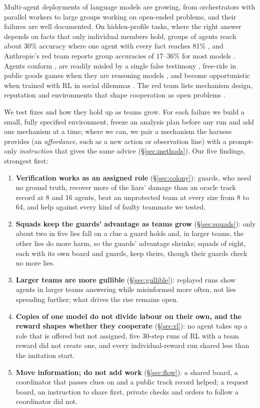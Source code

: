 \documentclass{article}
\begin{document}
Multi-agent deployments of language models are growing, from orchestrators with parallel workers \citep{anthropic2025research} to large groups working on open-ended problems, and their failures are well documented. On hidden-profile tasks, where the right answer depends on facts that only individual members hold, groups of agents reach about 30\% accuracy where one agent with every fact reaches 81\% \citep{li2026hiddenbench}, and Anthropic's red team reports group accuracies of 17--36\% for most models \citep{anthropic2026redteam}. Agents conform \citep{weng2025conformity}, are readily misled by a single false testimony \citep{yan2026distributed}, free-ride in public goods games when they are reasoning models \citep{guzman2025corrupted}, and become opportunistic when trained with RL in social dilemmas \citep{piche2025robust}. The red team lists mechanism design, reputation and environments that shape cooperation as open problems \citep{anthropic2026redteam}.

We test fixes and how they hold up as teams grow. For each failure we build a small, fully specified environment, freeze an analysis plan before any run and add one mechanism at a time; where we can, we pair a mechanism the harness provides (an \emph{affordance}, such as a new action or observation line) with a prompt-only \emph{instruction} that gives the same advice (\S\ref{sec:methods}). Our five findings, strongest first:

\begin{enumerate}
\item \textbf{Verification works as an assigned role} (\S\ref{sec:colony}): guards, who need no ground truth, recover more of the liars' damage than an oracle track record at 8 and 16 agents, beat an unprotected team at every size from 8 to 64, and help against every kind of faulty teammate we tested.
\item \textbf{Squads keep the guards' advantage as teams grow} (\S\ref{sec:squads}): only about two in five lies fall on a clue a guard holds and, in larger teams, the other lies do more harm, so the guards' advantage shrinks; squads of eight, each with its own board and guards, keep theirs, though their guards check no more lies.
\item \textbf{Larger teams are more gullible} (\S\ref{sec:gullible}): replayed runs show agents in larger teams answering while misinformed more often, not lies spreading further; what drives the rise remains open.
\item \textbf{Copies of one model do not divide labour on their own, and the reward shapes whether they cooperate} (\S\ref{sec:rl}): no agent takes up a role that is offered but not assigned, five 30-step runs of RL with a team reward did not create one, and every individual-reward run shared less than the imitation start.
\item \textbf{Move information; do not add work} (\S\ref{sec:flow}): a shared board, a coordinator that passes clues on and a public track record helped; a request board, an instruction to share first, private checks and orders to follow a coordinator did not.
\end{enumerate}
\end{document}
